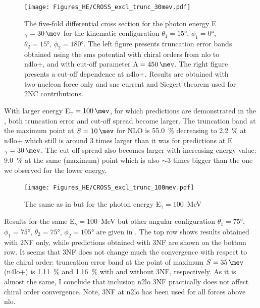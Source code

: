     \begin{figure}[h]
        \begin{center}
            \texttt{[image: Figures\_HE/CROSS\_excl\_trunc\_30mev.pdf]}
            \end{center}
            \caption{The five-fold differential cross section for the photon 
            energy E$_\gamma=\SI{30}{\mev}$ for the kinematic configuration
            $\theta_1 = \ang{15}$, $\phi_1 = \ang{0}$,
            $\theta_2 = \ang{15}$, $\phi_2 = \ang{180}$.
            The left figure presents truncation error bands obtained using the \gls{sms} potential
            with chiral orders from \gls{nlo} to \gls{n4lo+}, and with
            cut-off parameter $\Lambda=\SI{450}{\mev}$.
            The right figure presents a cut-off dependence at \gls{n4lo+}.
            Results are obtained with two-nucleon force only and \gls{snc} current
            and Siegert theorem used for 2NC contributions.}
            \label{CROSS_HE_EXCL_30}
        \end{figure}

    With larger energy E$_\gamma=\SI{100}{\mev}$, for which predictions
    are demonstrated in the ,
    both truncation error and cut-off spread become larger.
    The truncation band at the maximum point at $S=\SI{10}{\mev}$ for NLO is \SI{55.0}{\percent}
    decreasing to \SI{2.2}{\percent} at \gls{n4lo+} which still is around 3 times larger than
    it was for predictions at E$_\gamma=\SI{30}{\mev}$.
    The cut-off spread also becomes larger with increasing energy value: \SI{9.0}{\percent}
    at the same (maximum) point which is also $\sim 3$ times bigger than the one we observed
    for the lower energy.

        \begin{figure}[h]
            \begin{center}
            \texttt{[image: Figures\_HE/CROSS\_excl\_trunc\_100mev.pdf]}
            \end{center}
            \caption{The same as in  but 
            for the photon energy E$_\gamma=100$~MeV}
            \label{CROSS_HE_EXCL_100}
        \end{figure}

    Results for the same E$_\gamma=100$~MeV but other angular configuration  
    $\theta_1 = \ang{75}$, $\phi_1 = \ang{75}$,
    $\theta_2 = \ang{75}$, $\phi_2 = \ang{105}$ are
    given in .
    The top row shows results obtained with 2NF only, while predictions obtained with 3NF are shown
    on the bottom row.
    It seems that 3NF does not change much the convergence with respect to the chiral order:
    truncation error band at the point of maximum $S=\SI{35}{\mev}$ (\gls{n4lo+})
    is \SI{1.11}{\percent} and \SI{1.16}{\percent} with and without 3NF, respectively.
    As it is almost the same, I conclude that inclusion \gls{n2lo} 3NF practically
    does not affect chiral order convergence.
    Note, 3NF at \gls{n2lo} has been used for all forces above \gls{nlo}.

